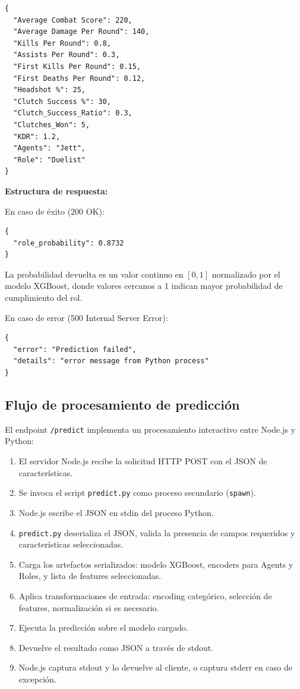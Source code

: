 \documentclass{ULBreport} %
\begin{document}
\begin{verbatim}
{
  "Average Combat Score": 220,
  "Average Damage Per Round": 140,
  "Kills Per Round": 0.8,
  "Assists Per Round": 0.3,
  "First Kills Per Round": 0.15,
  "First Deaths Per Round": 0.12,
  "Headshot %": 25,
  "Clutch Success %": 30,
  "Clutch_Success_Ratio": 0.3,
  "Clutches_Won": 5,
  "KDR": 1.2,
  "Agents": "Jett",
  "Role": "Duelist"
}
\end{verbatim}

\textbf{Estructura de respuesta:}

En caso de éxito (200 OK):

\begin{verbatim}
{
  "role_probability": 0.8732
}
\end{verbatim}

La probabilidad devuelta es un valor continuo en $[0, 1]$ normalizado por el modelo XGBoost, donde valores cercanos a 1 indican mayor probabilidad de cumplimiento del rol.

En caso de error (500 Internal Server Error):

\begin{verbatim}
{
  "error": "Prediction failed",
  "details": "error message from Python process"
}
\end{verbatim}

\subsection{Flujo de procesamiento de predicción}

El endpoint \texttt{/predict} implementa un procesamiento interactivo entre Node.js y Python:

\begin{enumerate}
    \item El servidor Node.js recibe la solicitud HTTP POST con el JSON de características.
    \item Se invoca el script \texttt{predict.py} como proceso secundario (\texttt{spawn}).
    \item Node.js escribe el JSON en stdin del proceso Python.
    \item \texttt{predict.py} deserializa el JSON, valida la presencia de campos requeridos y características seleccionadas.
    \item Carga los artefactos serializados: modelo XGBoost, encoders para Agents y Roles, y lista de features seleccionadas.
    \item Aplica transformaciones de entrada: encoding categórico, selección de features, normalización si es necesario.
    \item Ejecuta la predicción sobre el modelo cargado.
    \item Devuelve el resultado como JSON a través de stdout.
    \item Node.js captura stdout y lo devuelve al cliente, o captura stderr en caso de excepción.
\end{enumerate}
\end{document}
